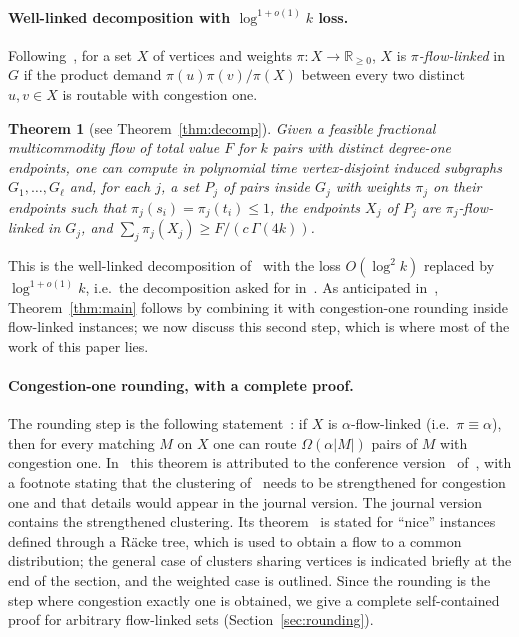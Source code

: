 \documentclass[11pt,letterpaper]{article}
\newtheorem{theorem}{Theorem}[section]
\theoremstyle{definition}
\newcommand{\R}{\mathbb{R}}
\begin{document}
\paragraph{Well-linked decomposition with $\log^{1+o(1)}k$ loss.}
Following~\cite{CKS05}, for a set $X$ of vertices and weights $\pi:X\to\R_{\ge0}$, $X$ is
\emph{$\pi$-flow-linked} in $G$ if the product demand $\pi(u)\pi(v)/\pi(X)$ between every two
distinct $u,v\in X$ is routable with congestion one.

\begin{theorem}[see Theorem~\ref{thm:decomp}]\label{thm:decomp-intro}
Given a feasible fractional multicommodity flow of total value $F$ for $k$ pairs with distinct
degree-one endpoints, one can compute in polynomial time vertex-disjoint induced subgraphs
$G_1,\dots,G_\ell$ and, for each $j$, a set $P_j$ of pairs inside $G_j$ with weights
$\pi_j$ on their endpoints such that $\pi_j(s_i)=\pi_j(t_i)\le1$, the endpoints $X_j$ of
$P_j$ are $\pi_j$-flow-linked in $G_j$, and $\sum_j\pi_j(X_j)\ge F/(c\,\Gamma(4k))$.
\end{theorem}

This is the well-linked decomposition of~\cite[Theorem~2.1]{CKS05} with the loss
$O(\log^2 k)$ replaced by $\log^{1+o(1)}k$, i.e.\ the decomposition asked for
in~\cite[Section~5]{BJS26}. As anticipated in~\cite{BJS26}, Theorem~\ref{thm:main} follows by
combining it with congestion-one rounding inside flow-linked instances; we now discuss this
second step, which is where most of the work of this paper lies.

\paragraph{Congestion-one rounding, with a complete proof.}
The rounding step is the following statement~\cite[Theorem~3.1]{CKS05}: if $X$ is
$\alpha$-flow-linked (i.e.\ $\pi\equiv\alpha$), then for every matching $M$ on $X$ one can
route $\Omega(\alpha|M|)$ pairs of $M$ with congestion one. In~\cite{CKS05} this theorem is
attributed to the conference version~\cite{CKS04} of~\cite{CKS13}, with a footnote stating
that the clustering of~\cite{CKS04} needs to be strengthened for congestion one and that
details would appear in the journal version. The journal version~\cite[Section~3.4]{CKS13}
contains the strengthened clustering. Its theorem~\cite[Theorem~3.8]{CKS13} is stated for
``nice'' instances defined through a R\"acke tree, which is used to obtain a flow to a common
distribution; the general case of clusters sharing vertices is indicated briefly at the end
of the section, and the weighted case is outlined. Since the rounding is the step where
congestion exactly one is obtained, we give a complete self-contained proof for arbitrary
flow-linked sets (Section~\ref{sec:rounding}).
\end{document}

